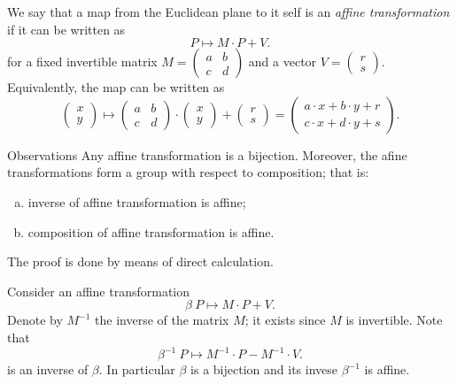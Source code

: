 We say that a map from the Euclidean plane to it self is an \emph{affine transformation} if it can be written as
\[P\mapsto  M \cdot P +V.\]
for a fixed invertible matrix $M=(\begin{smallmatrix}a&b\\c&d\end{smallmatrix})$ and a vector $V=(\begin{smallmatrix}r\\s\end{smallmatrix})$.
Equivalently, the map can be written as 
\[(\begin{smallmatrix}x\\y\end{smallmatrix})
\mapsto
(\begin{smallmatrix}a&b\\c&d\end{smallmatrix})
\cdot
(\begin{smallmatrix}x\\y\end{smallmatrix})
+
(\begin{smallmatrix}r\\s\end{smallmatrix})=
(\begin{smallmatrix}a\cdot x+b\cdot y+r\\c\cdot x+d\cdot y+s\end{smallmatrix}).\]

\begin{thm}{Observations}\label{obs:matrix-vector}
Any affine transformation is a bijection.
Moreover, the afine transformations form a group with respect to composition;
that is:
\begin{enumerate}[(a)]
\item inverse of affine transformation is affine;
\item composition of affine transformation is affine.
\end{enumerate}
\end{thm}

The proof is done by means of direct calculation.

Consider an affine transformation
\[\beta\:P \mapsto M\cdot P+V.\]
Denote by $M^{-1}$ the inverse of the matrix $M$;
it exists since $M$ is invertible.
Note that 
\[\beta^{-1}\:P
  \mapsto
  M^{-1}
  \cdot
  P
  -
M^{-1}\cdot V.\]
is an inverse of $\beta$.
In particular $\beta$ is a bijection and its invese $\beta^{-1}$ is affine.

